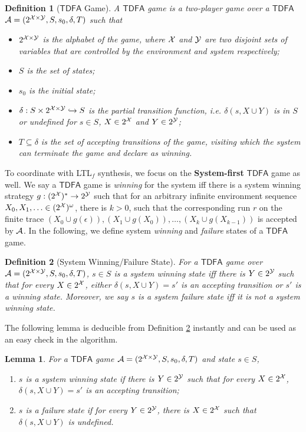 \documentclass[letterpaper]{article} %
\newcommand{\ltlf}{\textsf{LTL}$_f$\xspace}
\newtheorem{lemma}{Lemma}
\newtheorem{definition}{Definition}
\def\tdfa{$\mathsf{TDFA}$\xspace}
\begin{document}
\begin{definition}[\tdfa Game]\label{def:tdfa-game}
	A \tdfa game is a two-player game over a \tdfa $\mathcal{A} = (2^{\mathcal{X} \times \mathcal{Y}}, S, s_0, \delta, T)$ such that 
	\begin{itemize}
		\item $2^{\mathcal{X} \times \mathcal{Y}}$ is the alphabet of the game, where $\mathcal{X}$ and $\mathcal{Y}$ are two disjoint sets of variables that are controlled by the environment and system respectively;
		\item $S$ is the set of states;
		\item $s_0$ is the initial state;
		\item $\delta:S\times 2^{\mathcal{X} \times \mathcal{Y}}\hookrightarrow S$ is the partial transition function, i.e. $\delta (s, X\cup Y)$ is in $S$ or undefined for $s\in S$, $X\in 2^{\mathcal{X}}$ and $Y\in 2^{\mathcal{Y}}$;
    \item $T \subseteq \delta$ is the set of accepting transitions of the game, visiting which the system can terminate the game and declare as winning.
	\end{itemize}
\end{definition}
To coordinate with \ltlf synthesis, we focus on the \textbf{System-first} \tdfa game as well. We say a \tdfa game is \emph{winning} for the system iff there is a system winning strategy $g: (2^{\mathcal{X}})^*\rightarrow 2^{\mathcal{Y}}$ such that for an arbitrary infinite environment sequence $X_0,X_1,\ldots\in (2^{\mathcal{X}})^{\omega}$, there is $k > 0$, such that the corresponding run $r $ on the finite trace $ (X_0\cup g(\epsilon)), (X_1\cup g(X_0)),\ldots, (X_k\cup g(X_{k-1}))$ is accepted by $\mathcal{A}$.
In the following, we define system \emph{winning} and \emph{failure} states of a \tdfa game.

\begin{definition}[System Winning/Failure State]\label{def:winning_failure_state}
\label{def:win_st}
For a \tdfa game over $\mathcal{A} =(2^{\mathcal{X} \times \mathcal{Y}},S,s_0,\delta,T)$, $s\in S$ is a system winning state iff there is $Y \in 2^{\mathcal{Y}}$ such that for every $X \in 2^{\mathcal{X}}$, either $\delta(s,X\cup Y)=s'$ is an accepting transition or $s'$ is a winning state. Moreover, we say $s$ is a system failure state iff it is not a system winning state.
\end{definition}

The following lemma is deducible from Definition \ref{def:winning_failure_state} instantly and can be used as an easy check in the algorithm. 

\begin{lemma}
For a \tdfa game $\mathcal{A} =(2^{\mathcal{X} \times \mathcal{Y}},S,s_0,\delta,T)$ and state $s\in S$, 
\begin{enumerate}
	\item $s$ is a system winning state if there is $Y \in 2^{\mathcal{Y}}$ such that for every $X \in 2^{\mathcal{X}}$, $\delta(s,X\cup Y)=s'$ is an accepting transition;
	\item $s$ is a failure state if for every $Y \in 2^{\mathcal{Y}}$, there is $X \in 2^{\mathcal{X}}$ such that $\delta(s,X \cup Y)$ is undefined.
\end{enumerate} 
\end{lemma}
\end{document}
